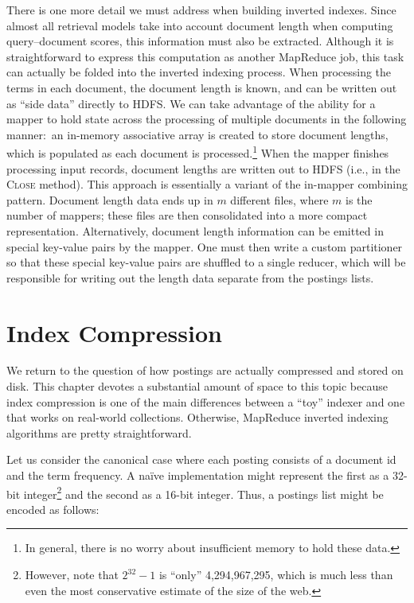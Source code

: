 There is one more detail we must address when building inverted
indexes.  Since almost all retrieval models take into account document
length when computing query--document scores, this information must
also be extracted.  Although it is straightforward to express this
computation as another MapReduce job, this task can actually be folded
into the inverted indexing process.  When processing the terms in each
document, the document length is known, and can be written out as
``side data'' directly to HDFS.  We can take advantage of the ability
for a mapper to hold state across the processing of multiple documents
in the following manner:\ an in-memory associative array is created to
store document lengths, which is populated as each document is
processed.\footnote{In general, there is no worry about insufficient
  memory to hold these data.}  When the mapper finishes processing
input records, document lengths are written out to HDFS (i.e., in the
\textsc{Close} method).  This approach is essentially a variant of the
in-mapper combining pattern.  Document length data ends up in $m$
different files, where $m$ is the number of mappers; these files are
then consolidated into a more compact representation.  Alternatively,
document length information can be emitted in special key-value pairs
by the mapper.  One must then write a custom partitioner so that these
special key-value pairs are shuffled to a single reducer, which will
be responsible for writing out the length data separate from the
postings lists.

\section{Index Compression}
\label{chapter-indexing:index:compression}

We return to the question of how postings are actually compressed and
stored on disk.  This chapter devotes a substantial amount of space to
this topic because index compression is one of the main differences
between a ``toy'' indexer and one that works on real-world
collections.  Otherwise, MapReduce inverted indexing algorithms are
pretty straightforward.

Let us consider the canonical case where each posting consists of a
document id and the term frequency.  A na\"ive implementation might
represent the first as a 32-bit integer\footnote{However, note that
  $2^{32}-1$ is ``only'' 4,294,967,295, which is much less than even
  the most conservative estimate of the size of the web.} and the
second as a 16-bit integer.  Thus, a postings list might be encoded as
follows:

